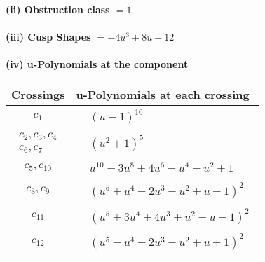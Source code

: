 \documentclass[1p]{elsarticle_modified}
\theoremstyle{definition}
\begin{document}
\flushleft \textbf{(ii) Obstruction class $= 1$}\\~\\
\flushleft \textbf{(iii) Cusp Shapes $= -4 u^3+8 u-12$}\\~\\
\newpage\renewcommand{\arraystretch}{1}
\flushleft \textbf{(iv) u-Polynomials at the component}\newline \\
\begin{tabular}{m{50pt}|m{274pt}}
Crossings & \hspace{64pt}u-Polynomials at each crossing \\
\hline $$\begin{aligned}c_{1}\end{aligned}$$&$\begin{aligned}
&(u-1)^{10}
\end{aligned}$\\
\hline $$\begin{aligned}c_{2},c_{3},c_{4}\\c_{6},c_{7}\end{aligned}$$&$\begin{aligned}
&(u^2+1)^5
\end{aligned}$\\
\hline $$\begin{aligned}c_{5},c_{10}\end{aligned}$$&$\begin{aligned}
&u^{10}-3 u^8+4 u^6- u^4- u^2+1
\end{aligned}$\\
\hline $$\begin{aligned}c_{8},c_{9}\end{aligned}$$&$\begin{aligned}
&(u^5+u^4-2 u^3- u^2+u-1)^2
\end{aligned}$\\
\hline $$\begin{aligned}c_{11}\end{aligned}$$&$\begin{aligned}
&(u^5+3 u^4+4 u^3+u^2- u-1)^2
\end{aligned}$\\
\hline $$\begin{aligned}c_{12}\end{aligned}$$&$\begin{aligned}
&(u^5- u^4-2 u^3+u^2+u+1)^2
\end{aligned}$\\
\hline
\end{tabular}\\~\\
\end{document}
